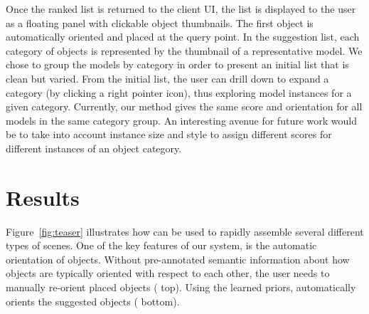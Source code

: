 \documentclass{sigchi}
\begin{document}
Once the ranked list is returned to the client UI, the list is displayed to the user as a floating panel with clickable object thumbnails.  The first object is automatically oriented and placed at the query point.  In the suggestion list, each category of objects is represented by the thumbnail of a representative model.  We chose to group the models by category in order to present an initial list that is clean but varied. From the initial list, the user can drill down to expand a category (by clicking a right pointer icon), thus exploring model instances for a given category. Currently, our method gives the same score and orientation for all models in the same category group.  An interesting avenue for future work would be to take into account instance size and style to assign different scores for different instances of an object category.



\section{Results}

Figure~\ref{fig:teaser} illustrates how \SceneSuggest can be used to rapidly assemble several different types of scenes.  One of the key features of our system, is the automatic orientation of objects.  Without pre-annotated semantic information about how objects are typically oriented with respect to each other, the user needs to manually re-orient placed objects ( top).  Using the learned priors, \SceneSuggest automatically orients the suggested objects ( bottom).
\end{document}
